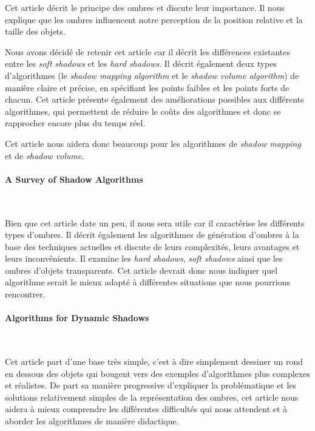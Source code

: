 \documentclass[a4paper,10pt]{report}
\begin{document}
Cet article décrit le principe des ombres et discute leur importance. Il nous explique que les ombres influencent notre perception de la position relative et la taille des objets.

Nous avons décidé de retenir cet article car il décrit les différences existantes entre les \textit{soft shadows} et les \textit{hard shadows}. Il décrit également deux types d'algorithmes (le \textit{shadow mapping algorithm} et le \textit{shadow volume algorithm}) de manière claire et précise, en spécifiant les points faibles et les points forts de chacun. Cet article présente également des améliorations possibles aux différents algorithmes, qui permettent de réduire le coûts des algorithmes et donc se rapprocher encore plus du temps réel.


Cet article nous aidera donc beaucoup pour les algorithmes de \textit{shadow mapping} et de \textit{shadow volume}.


\paragraph{\large A Survey of Shadow Algorithms}
~~\\
\cite{surveyofshadowalgorithms}

Bien que cet article date un peu, il nous sera utile car il caractérise les différents types d'ombres. Il décrit également les algorithmes de génération d'ombres à la base des techniques actuelles et discute de leurs complexités, leurs avantages et leurs inconvénients. Il examine les \textit{hard shadows}, \textit{soft shadows} ainsi que les ombres d'objets transparents. Cet article devrait donc nous indiquer quel algorithme serait le mieux adapté à différentes situations que nous pourrions rencontrer.

\paragraph{\large Algorithms for Dynamic Shadows}
~~\\
\cite{dynamicshadowsalgorithms}

Cet article part d'une base très simple, c'est à dire simplement dessiner un rond en dessous des objets qui bougent vers des exemples d'algorithmes plus complexes et réalistes. De part sa manière progressive d'expliquer la problématique et les solutions relativement simples de la représentation des ombres, cet article nous aidera à mieux comprendre les différentes difficultés qui nous attendent et à aborder les algorithmes de manière didactique.
\pagebreak
\end{document}
